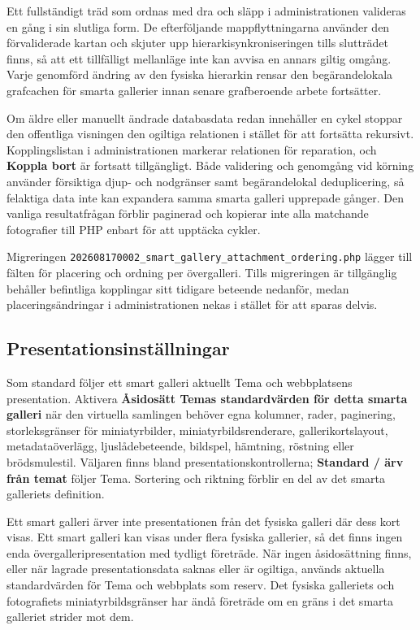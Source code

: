 \documentclass[11pt,a4paper]{article}
\newcommand{\ui}[1]{\textbf{#1}}
\begin{document}
Ett fullständigt träd som ordnas med dra och släpp i administrationen valideras
en gång i sin slutliga form. De efterföljande mappflyttningarna använder den
förvaliderade kartan och skjuter upp hierarkisynkroniseringen tills slutträdet
finns, så att ett tillfälligt mellanläge inte kan avvisa en annars giltig
omgång. Varje genomförd ändring av den fysiska hierarkin rensar den
begärandelokala grafcachen för smarta gallerier innan senare grafberoende arbete
fortsätter.

Om äldre eller manuellt ändrade databasdata redan innehåller en cykel stoppar
den offentliga visningen den ogiltiga relationen i stället för att fortsätta
rekursivt. Kopplingslistan i administrationen markerar relationen för
reparation, och \ui{Koppla bort} är fortsatt tillgängligt. Både validering och
genomgång vid körning använder försiktiga djup- och nodgränser samt
begärandelokal deduplicering, så felaktiga data inte kan expandera samma smarta
galleri upprepade gånger. Den vanliga resultatfrågan förblir paginerad och
kopierar inte alla matchande fotografier till PHP enbart för att upptäcka
cykler.

Migreringen \texttt{202608170002\_smart\_gallery\_attachment\_ordering.php}
lägger till fälten för placering och ordning per övergalleri. Tills migreringen
är tillgänglig behåller befintliga kopplingar sitt tidigare beteende nedanför,
medan placeringsändringar i administrationen nekas i stället för att sparas
delvis.

\subsection{Presentationsinställningar}

Som standard följer ett smart galleri aktuellt Tema och webbplatsens
presentation. Aktivera \ui{Åsidosätt Temas standardvärden för detta smarta
galleri} när den virtuella samlingen behöver egna kolumner, rader, paginering,
storleksgränser för miniatyrbilder, miniatyrbildsrenderare, gallerikortslayout,
metadataöverlägg, ljuslådebeteende, bildspel, hämtning, röstning eller
brödsmulestil. Väljaren finns bland presentationskontrollerna; \ui{Standard /
ärv från temat} följer Tema. Sortering och riktning förblir en del av det smarta
galleriets definition.

Ett smart galleri ärver inte presentationen från det fysiska galleri där dess
kort visas. Ett smart galleri kan visas under flera fysiska gallerier, så det
finns ingen enda övergalleripresentation med tydligt företräde. När ingen
åsidosättning finns, eller när lagrade presentationsdata saknas eller är
ogiltiga, används aktuella standardvärden för Tema och webbplats som reserv. Det
fysiska galleriets och fotografiets miniatyrbildsgränser har ändå företräde om
en gräns i det smarta galleriet strider mot dem.
\end{document}
